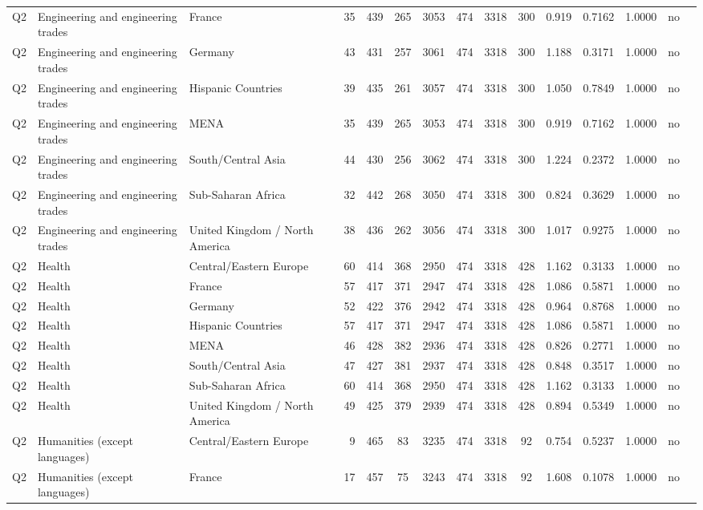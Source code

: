 \begin{longtable}{lllrcccccccccll}
Q2 & Engineering and engineering trades & France & 35 & 439 & 265 & 3053 & 474 & 3318 & 300 & 0.919 & 0.7162 & 1.0000 & no \\
Q2 & Engineering and engineering trades & Germany & 43 & 431 & 257 & 3061 & 474 & 3318 & 300 & 1.188 & 0.3171 & 1.0000 & no \\
Q2 & Engineering and engineering trades & Hispanic Countries & 39 & 435 & 261 & 3057 & 474 & 3318 & 300 & 1.050 & 0.7849 & 1.0000 & no \\
Q2 & Engineering and engineering trades & MENA & 35 & 439 & 265 & 3053 & 474 & 3318 & 300 & 0.919 & 0.7162 & 1.0000 & no \\
Q2 & Engineering and engineering trades & South/Central Asia & 44 & 430 & 256 & 3062 & 474 & 3318 & 300 & 1.224 & 0.2372 & 1.0000 & no \\
Q2 & Engineering and engineering trades & Sub-Saharan Africa & 32 & 442 & 268 & 3050 & 474 & 3318 & 300 & 0.824 & 0.3629 & 1.0000 & no \\
Q2 & Engineering and engineering trades & United Kingdom / North America & 38 & 436 & 262 & 3056 & 474 & 3318 & 300 & 1.017 & 0.9275 & 1.0000 & no \\
Q2 & Health & Central/Eastern Europe & 60 & 414 & 368 & 2950 & 474 & 3318 & 428 & 1.162 & 0.3133 & 1.0000 & no \\
Q2 & Health & France & 57 & 417 & 371 & 2947 & 474 & 3318 & 428 & 1.086 & 0.5871 & 1.0000 & no \\
Q2 & Health & Germany & 52 & 422 & 376 & 2942 & 474 & 3318 & 428 & 0.964 & 0.8768 & 1.0000 & no \\
Q2 & Health & Hispanic Countries & 57 & 417 & 371 & 2947 & 474 & 3318 & 428 & 1.086 & 0.5871 & 1.0000 & no \\
Q2 & Health & MENA & 46 & 428 & 382 & 2936 & 474 & 3318 & 428 & 0.826 & 0.2771 & 1.0000 & no \\
Q2 & Health & South/Central Asia & 47 & 427 & 381 & 2937 & 474 & 3318 & 428 & 0.848 & 0.3517 & 1.0000 & no \\
Q2 & Health & Sub-Saharan Africa & 60 & 414 & 368 & 2950 & 474 & 3318 & 428 & 1.162 & 0.3133 & 1.0000 & no \\
Q2 & Health & United Kingdom / North America & 49 & 425 & 379 & 2939 & 474 & 3318 & 428 & 0.894 & 0.5349 & 1.0000 & no \\
Q2 & Humanities (except languages) & Central/Eastern Europe & 9 & 465 & 83 & 3235 & 474 & 3318 & 92 & 0.754 & 0.5237 & 1.0000 & no \\
Q2 & Humanities (except languages) & France & 17 & 457 & 75 & 3243 & 474 & 3318 & 92 & 1.608 & 0.1078 & 1.0000 & no \\

\end{longtable}
